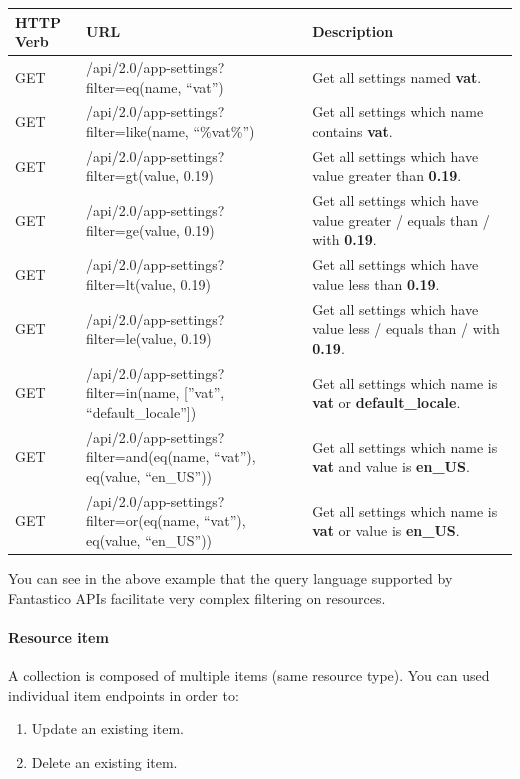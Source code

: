 \documentclass[letterpaper,10pt,english]{sphinxmanual}
\begin{document}
\begin{tabulary}{\linewidth}{|L|L|L|}
\hline

\textbf{HTTP Verb}
 & 
\textbf{URL}
 & 
\textbf{Description}
\\\hline

GET
 & 
/api/2.0/app-settings?filter=eq(name, ``vat'')
 & 
Get all settings named \textbf{vat}.
\\\hline

GET
 & 
/api/2.0/app-settings?filter=like(name, ``\%vat\%'')
 & 
Get all settings which name contains \textbf{vat}.
\\\hline

GET
 & 
/api/2.0/app-settings?filter=gt(value, 0.19)
 & 
Get all settings which have value greater than \textbf{0.19}.
\\\hline

GET
 & 
/api/2.0/app-settings?filter=ge(value, 0.19)
 & 
Get all settings which have value greater / equals than / with \textbf{0.19}.
\\\hline

GET
 & 
/api/2.0/app-settings?filter=lt(value, 0.19)
 & 
Get all settings which have value less than \textbf{0.19}.
\\\hline

GET
 & 
/api/2.0/app-settings?filter=le(value, 0.19)
 & 
Get all settings which have value less / equals than / with \textbf{0.19}.
\\\hline

GET
 & 
/api/2.0/app-settings?filter=in(name, {[}''vat'', ``default\_locale''{]})
 & 
Get all settings which name is \textbf{vat} or \textbf{default\_locale}.
\\\hline

GET
 & 
/api/2.0/app-settings?filter=and(eq(name, ``vat''), eq(value, ``en\_US''))
 & 
Get all settings which name is \textbf{vat} and value is \textbf{en\_US}.
\\\hline

GET
 & 
/api/2.0/app-settings?filter=or(eq(name, ``vat''), eq(value, ``en\_US''))
 & 
Get all settings which name is \textbf{vat} or value is \textbf{en\_US}.
\\\hline
\end{tabulary}


You can see in the above example that the query language supported by Fantastico APIs facilitate very complex filtering on resources.


\paragraph{Resource item}
\label{features/roa/rest_standard:resource-item}
A collection is composed of multiple items (same resource type). You can used individual item endpoints in order to:
\begin{enumerate}
\item {} 
Update an existing item.

\item {} 
Delete an existing item.

\end{enumerate}
\end{document}
